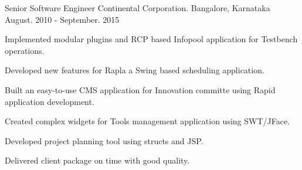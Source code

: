 \begin{cventries}
  \cventry
    {Senior Software Engineer} %
    {Continental Corporation.} %
    {Bangalore, Karnataka} %
    {August. 2010 - September. 2015} %
    {
      \begin{cvitems} %
        \item {Implemented modular plugins and RCP based Infopool application for Testbench operations.}
        \item {Developed new features for Rapla a Swing based scheduling application.}
        \item {Built an easy-to-use CMS application for Innovation committe using Rapid application development.}
        \item {Created complex widgets for Tools management application using SWT/JFace.}
        \item {Developed project planning tool using structs and JSP.}
        \item {Delivered client package on time with good quality.}
      \end{cvitems}
    }

\end{cventries}
